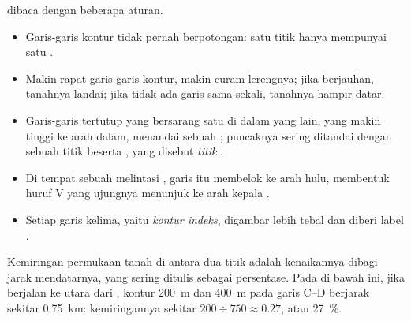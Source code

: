  dibaca dengan beberapa aturan.
\begin{itemize}
  \item Garis-garis kontur tidak pernah berpotongan: satu titik hanya
        mempunyai satu .
  \item Makin rapat garis-garis kontur, makin curam lerengnya; jika
        berjauhan, tanahnya landai; jika tidak ada garis sama sekali,
        tanahnya hampir datar.
  \item Garis-garis tertutup yang bersarang satu di dalam yang lain, yang
        makin tinggi ke arah dalam, menandai sebuah ; puncaknya sering
        ditandai dengan sebuah titik beserta , yang disebut
        \emph{titik }.
  \item Di tempat sebuah  melintasi , garis itu
        membelok ke arah hulu, membentuk huruf V yang ujungnya menunjuk ke
        arah kepala .
  \item Setiap garis kelima, yaitu \emph{kontur indeks}, digambar lebih
        tebal dan diberi label .
\end{itemize}

Kemiringan permukaan tanah di antara dua titik adalah kenaikannya dibagi
jarak mendatarnya, yang sering ditulis sebagai persentase. Pada  di
bawah ini, jika berjalan ke utara dari , kontur \qty{200}{m} dan
\qty{400}{m} pada garis C--D berjarak sekitar \qty{0.75}{km}: kemiringannya
sekitar $200 \div 750
\approx 0.27$, atau \qty{27}{\%}.

